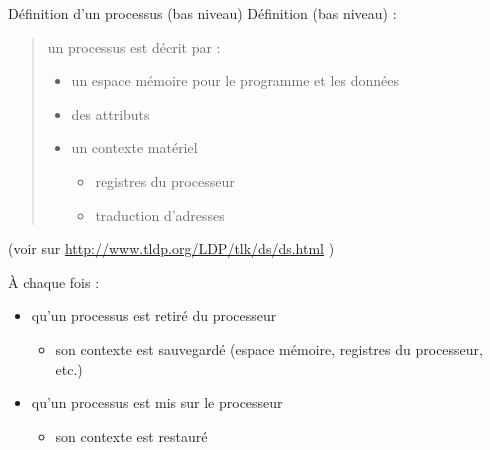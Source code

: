 \begin {frame} {Définition d'un processus (bas niveau)}
    Définition (bas niveau) :

    \begin {quote}
	un processus est décrit par :
	\begin {itemize}
	    \fB
	    \item un espace mémoire pour le programme et les données
	    \item des attributs
	    \item un contexte matériel
		\begin {itemize}
		    \fC
		    \item registres du processeur
		    \item traduction d'adresses
		\end {itemize}
	\end {itemize}
    \end {quote}

    { \fB (voir  sur
	\url {http://www.tldp.org/LDP/tlk/ds/ds.html} )}

    \vspace* {2mm}

    À chaque fois :
    \begin {itemize}
	\fB
	\item qu'un processus est retiré du processeur
	    \begin {itemize}
		\fC
		\item son contexte est sauvegardé (espace mémoire, registres
		    du processeur, etc.)
	    \end {itemize}
	\item qu'un processus est mis sur le processeur
	    \begin {itemize}
		\fC
		\item son contexte est restauré
	    \end {itemize}
    \end {itemize}
\end {frame}

